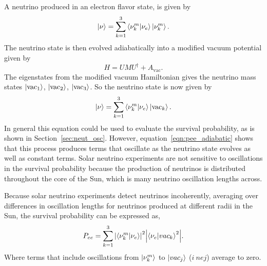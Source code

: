 A neutrino produced in an electron flavor state, is given by
\begin{equation}
    \ket{\nu} = \sum_{k=1}^{3}\braket{\nu^{m}_{k}}{\nu_{e}}\ket{\nu^{m}_{k}}\text{.}
\end{equation}
The neutrino state is then evolved adiabatically into a modified
vacuum potential given by
\begin{equation}
    H = U M U^{\dagger} + A_{\mathrm{vac}}\text{.}
\end{equation}
The eigenstates from the modified vacuum Hamiltonian gives the neutrino mass
states $\ket{\mathrm{vac}_{1}}$, $\ket{\mathrm{vac}_{2}}$, $\ket{\mathrm{vac}_{3}}$.
So the neutrino state is now given by
\begin{equation}
    \ket{\nu} = \sum_{k=1}^{3}\braket{\nu^{m}_{k}}{\nu_{e}}\ket{\mathrm{vac}_{k}}\text{.}
\end{equation}
In general this equation could be used to evaluate the
survival probability, as is shown in Section~\ref{sec:neut_osc}.
However, equation~\ref{eqn:pee_adiabatic} shows that this process produces
terms that oscillate as the neutrino state evolves as well as constant
terms.
Solar neutrino experiments are not sensitive to oscillations in the survival
probability because the production of neutrinos is distributed
throughout the core of the Sun, which is many neutrino oscillation lengths
across.


Because solar neutrino experiments detect neutrinos incoherently, averaging
over differences in oscillation lengths for neutrinos produced
at different radii in the Sun, the survival probability can be expressed as,
\begin{equation}
    P_{ee} = \sum_{k=1}^{3}\abs{\braket{\nu^{m}_{k}}{\nu_{e}}}^{2}\abs{\braket{\nu_{e}}{vac_{k}}^{2}}\text{.}
\end{equation}
Where terms that include oscillations from $\ket{\nu^{m}_{k}}$ to $\ket{vac_{j}}$ ($i\ ne j$)
average to zero.

